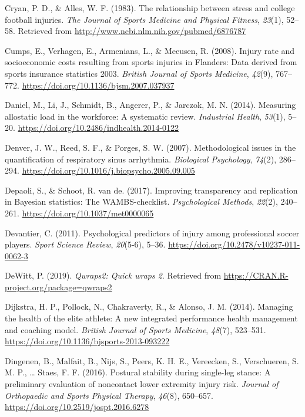 \documentclass[
  english,
  man,floatsintext]{apa6}
\begin{document}
\leavevmode\hypertarget{ref-Cryan1983}{}%
Cryan, P. D., \& Alles, W. F. (1983). The relationship between stress and college football injuries. \emph{The Journal of Sports Medicine and Physical Fitness}, \emph{23}(1), 52--58. Retrieved from \url{http://www.ncbi.nlm.nih.gov/pubmed/6876787}

\leavevmode\hypertarget{ref-Cumps2008a}{}%
Cumps, E., Verhagen, E., Armenians, L., \& Meeusen, R. (2008). Injury rate and socioeconomic costs resulting from sports injuries in Flanders: Data derived from sports insurance statistics 2003. \emph{British Journal of Sports Medicine}, \emph{42}(9), 767--772. \url{https://doi.org/10.1136/bjsm.2007.037937}

\leavevmode\hypertarget{ref-Mauss2014}{}%
Daniel, M., Li, J., Schmidt, B., Angerer, P., \& Jarczok, M. N. (2014). Measuring allostatic load in the workforce: A systematic review. \emph{Industrial Health}, \emph{53}(1), 5--20. \url{https://doi.org/10.2486/indhealth.2014-0122}

\leavevmode\hypertarget{ref-Denver2007}{}%
Denver, J. W., Reed, S. F., \& Porges, S. W. (2007). Methodological issues in the quantification of respiratory sinus arrhythmia. \emph{Biological Psychology}, \emph{74}(2), 286--294. \url{https://doi.org/10.1016/j.biopsycho.2005.09.005}

\leavevmode\hypertarget{ref-Depaoli2017}{}%
Depaoli, S., \& Schoot, R. van de. (2017). Improving transparency and replication in Bayesian statistics: The WAMBS-checklist. \emph{Psychological Methods}, \emph{22}(2), 240--261. \url{https://doi.org/10.1037/met0000065}

\leavevmode\hypertarget{ref-Devantier2011}{}%
Devantier, C. (2011). Psychological predictors of injury among professional soccer players. \emph{Sport Science Review}, \emph{20}(5-6), 5--36. \url{https://doi.org/10.2478/v10237-011-0062-3}

\leavevmode\hypertarget{ref-R-qwraps2}{}%
DeWitt, P. (2019). \emph{Qwraps2: Quick wraps 2}. Retrieved from \url{https://CRAN.R-project.org/package=qwraps2}

\leavevmode\hypertarget{ref-Dijkstra2014}{}%
Dijkstra, H. P., Pollock, N., Chakraverty, R., \& Alonso, J. M. (2014). Managing the health of the elite athlete: A new integrated performance health management and coaching model. \emph{British Journal of Sports Medicine}, \emph{48}(7), 523--531. \url{https://doi.org/10.1136/bjsports-2013-093222}

\leavevmode\hypertarget{ref-Dingenen2016}{}%
Dingenen, B., Malfait, B., Nijs, S., Peers, K. H. E., Vereecken, S., Verschueren, S. M. P., \ldots{} Staes, F. F. (2016). Postural stability during single-leg stance: A preliminary evaluation of noncontact lower extremity injury risk. \emph{Journal of Orthopaedic and Sports Physical Therapy}, \emph{46}(8), 650--657. \url{https://doi.org/10.2519/jospt.2016.6278}
\end{document}
